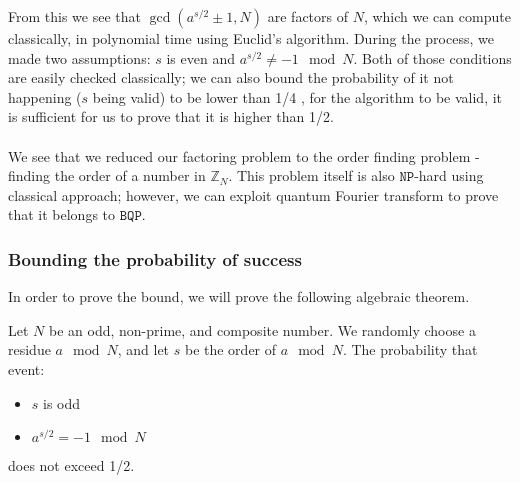 From this we see that $\gcd(a^{s/2}\pm 1,N)$ are factors of $N$, which we can compute classically, in polynomial time using Euclid's algorithm.
During the process, we made two assumptions: $s$ is even and $a^{s/2}\neq -1 \mod{N}$. Both of those conditions are easily checked classically; we can also bound the probability of it not happening ($s$ being valid) to be lower than 1/4 \cite{thebook}, for the algorithm to be valid, it is sufficient for us to prove that it is higher than 1/2.\\\\
We see that we reduced our factoring problem to the order finding problem - finding the order of a number in $\mathbb{Z}_N$. This problem itself is also $\mathtt{NP}$-hard using classical approach; however, we can exploit quantum Fourier transform to prove that it belongs to $\mathtt{BQP}$.
\subsubsection{Bounding the probability of success}
In order to prove the bound, we will prove the following algebraic theorem. 
\begin{theorem}
 Let $N$ be an odd, non-prime, and composite number. We randomly choose a residue $a \mod{N}$, and let $s$ be the order of $a \mod{N}$. The probability that event: 
 \begin{itemize}
     \item $s$ is odd
     \item $a^{s/2}=-1 \mod{N}$ 
 \end{itemize}
  does not exceed 1/2.
  \end{theorem}
